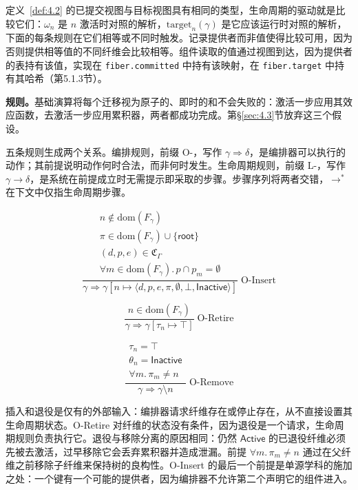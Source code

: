 定义~\ref{def:4.2} 的已提交视图与目标视图具有相同的类型，生命周期的驱动就是比较它们：$\omega_n$ 是 $n$ 激活时对照的解析，$\mathrm{target}_n(\gamma)$ 是它应该运行时对照的解析，下面的每条规则在它们相等或不同时触发。记录提供者而非值使得比较可用，因为否则提供相等值的不同纤维会比较相等。组件读取的值通过视图到达，因为提供者的表持有该值，实现在 \texttt{fiber.committed} 中持有该映射，在 \texttt{fiber.target} 中持有其哈希（第5.1.3节）。

\textbf{规则。}基础演算将每个迁移视为原子的、即时的和不会失败的：激活一步应用其效应函数，去激活一步应用累积器，两者都成功完成。第\S\ref{sec:4.3}节放弃这三个假设。

五条规则生成两个关系。编排规则，前缀 O-，写作 $\gamma \Rightarrow \delta$，是编排器可以执行的动作；其前提说明动作何时合法，而非何时发生。生命周期规则，前缀 L-，写作 $\gamma \longrightarrow \delta$，是系统在前提成立时无需提示即采取的步骤。步骤序列将两者交错，$\longrightarrow^*$ 在下文中仅指生命周期步骤。

\[
\frac{
\begin{array}{c}
n \notin \mathrm{dom}(F_\gamma) \\
\pi \in \mathrm{dom}(F_\gamma) \cup \{\mathsf{root}\} \\
(d, p, e) \in \mathfrak{C}_\Gamma \\
\forall m \in \mathrm{dom}(F_\gamma).\, p \cap p_m = \emptyset
\end{array}
}{
\gamma \Rightarrow \gamma[n \mapsto \langle d, p, e, \pi, \emptyset, \bot, \mathsf{Inactive}\rangle]
}\;\text{O-Insert}
\]

\[
\frac{n \in \mathrm{dom}(F_\gamma)}{
\gamma \Rightarrow \gamma[\tau_n \mapsto \top]
}\;\text{O-Retire}
\]

\[
\frac{
\begin{array}{c}
\tau_n = \top \\
\theta_n = \mathsf{Inactive} \\
\forall m.\, \pi_m \neq n
\end{array}
}{
\gamma \Rightarrow \gamma \setminus n
}\;\text{O-Remove}
\]

插入和退役是仅有的外部输入：编排器请求纤维存在或停止存在，从不直接设置其生命周期状态。O-Retire 对纤维的状态没有条件，因为退役是一个请求，生命周期规则负责执行它。退役与移除分离的原因相同：仍然 $\mathsf{Active}$ 的已退役纤维必须先被去激活，过早移除它会丢弃累积器并造成泄漏。前提 $\forall m.\, \pi_m \neq n$ 通过在父纤维之前移除子纤维来保持树的良构性。O-Insert 的最后一个前提是单源学科的施加之处：一个键有一个可能的提供者，因为编排器不允许第二个声明它的组件进入。

